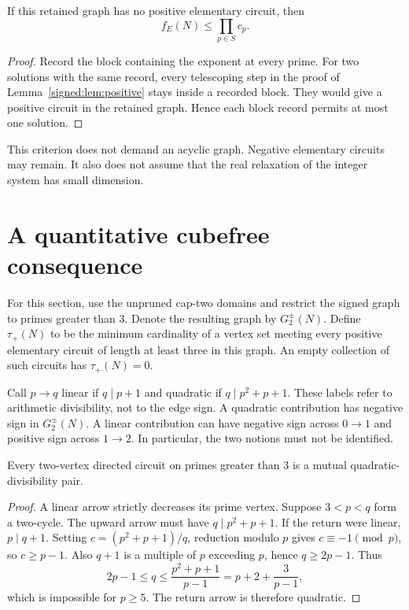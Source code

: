 \begin{corollary}\label{signed:cor:cuts}
If this retained graph has no positive elementary circuit, then
\[
 \boxed{f_E(N)\le\prod_{p\in S}c_p.}
\]
\end{corollary}
\begin{proof}
Record the block containing the exponent at every prime. For two solutions with the same record, every telescoping step in the proof of Lemma~\ref{signed:lem:positive} stays inside a recorded block. They would give a positive circuit in the retained graph. Hence each block record permits at most one solution.
\end{proof}

This criterion does not demand an acyclic graph. Negative elementary circuits may remain. It also does not assume that the real relaxation of the integer system has small dimension.


\section{A quantitative cubefree consequence}
For this section, use the unpruned cap-two domains and restrict the signed graph to primes greater than $3$. Denote the resulting graph by $G_2^\pm(N)$. Define $\tau_+(N)$ to be the minimum cardinality of a vertex set meeting every positive elementary circuit of length at least three in this graph. An empty collection of such circuits has $\tau_+(N)=0$.

Call $p\to q$ linear if $q\mid p+1$ and quadratic if $q\mid p^2+p+1$. These labels refer to arithmetic divisibility, not to the edge sign. A quadratic contribution has negative sign in $G_2^\pm(N)$. A linear contribution can have negative sign across $0\to1$ and positive sign across $1\to2$. In particular, the two notions must not be identified.

\begin{lemma}\label{signed:lem:mixed}
Every two-vertex directed circuit on primes greater than $3$ is a mutual quadratic-divisibility pair.
\end{lemma}
\begin{proof}
A linear arrow strictly decreases its prime vertex. Suppose $3<p<q$ form a two-cycle. The upward arrow must have $q\mid p^2+p+1$. If the return were linear, $p\mid q+1$. Setting $c=(p^2+p+1)/q$, reduction modulo $p$ gives $c\equiv-1\pmod p$, so $c\ge p-1$. Also $q+1$ is a multiple of $p$ exceeding $p$, hence $q\ge2p-1$. Thus
\[
 2p-1\le q\le\frac{p^2+p+1}{p-1}=p+2+\frac3{p-1},
\]
which is impossible for $p\ge5$. The return arrow is therefore quadratic.
\end{proof}

